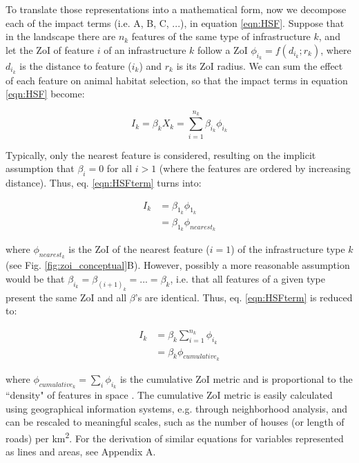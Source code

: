 \documentclass[titlepage]{article}
\begin{document}
To translate those representations into a mathematical form, now we decompose each of the impact terms (i.e. A, B, C, ...), in equation \ref{eqn:HSF}. Suppose that in the landscape there are $n_k$ features of the same type of infrastructure $k$, and let the ZoI of feature $i$ of an infrastructure $k$ follow a ZoI $\phi_{i_k} = f(d_{i_k}; r_k)$, where $d_{i_k}$ is the distance to feature ($i_k$) and $r_k$ is its ZoI radius. We can sum the effect of each feature on animal habitat selection, so that the impact terms in equation \ref{eqn:HSF} become:

\begin{equation}
\label{eqn:HSFterm}
    I_k = \beta_k X_k = \sum_{i=1}^{n_k} \beta_{i_k} \phi_{i_k}
\end{equation}

Typically, only the nearest feature is considered, resulting on the implicit assumption that $\beta_i = 0$ for all $i > 1$ (where the features are ordered by increasing distance). Thus, eq. \ref{eqn:HSFterm} turns into:

\begin{equation}
\label{eqn:HSFnearest}
\begin{split}
    I_k & = \beta_{1_k} \phi_{1_k} \\
        & = \beta_{1_k} \phi_{nearest_k}
\end{split}                
\end{equation}

where $\phi_{nearest_k}$ is the ZoI of the nearest feature ($i = 1$) of the infrastructure type $k$ (see Fig. \ref{fig:zoi_conceptual}B). However, possibly a more reasonable assumption would be that $\beta_{i_k} = \beta_{{(i+1)}_k} = ... = \beta_k$, i.e. that all features of a given type present the same ZoI and all $\beta$'s are identical. Thus, eq. \ref{eqn:HSFterm} is reduced to:

\begin{equation}
\label{eqn:HSFcuminf}
\begin{split}
    I_k & = \beta_k \sum_{i=1}^{n_k} \phi_{i_k} \\
        & = \beta_k \phi_{cumulative_k}
\end{split}
\end{equation}

where $\phi_{cumulative_k} = \sum_{i} \phi_{i_k}$ is the cumulative ZoI metric and is proportional to 
the ``density" of features in space \citep[e.g.][]{panzacchi_searching_2015}. The cumulative ZoI metric is easily calculated using geographical information systems, e.g. through neighborhood analysis, and can be rescaled to meaningful scales, such as the number of houses (or length of roads) per km\textsuperscript{2}. For the derivation of similar equations for variables represented as lines and areas, see Appendix A.
\end{document}
